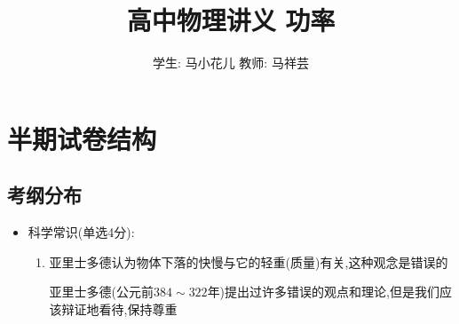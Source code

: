 \documentclass{article}
\title{高中物理讲义 \quad 功率}
\author{学生: 马小花儿 \quad 教师: 马祥芸}
\begin{document}
    \maketitle
    \tableofcontents
    \newpage

    \section{半期试卷结构}  
    \subsection{考纲分布}
    \begin{itemize}
        \item 科学常识(单选4分):
        
        \begin{enumerate}
            \item 亚里士多德认为物体下落的快慢与它的轻重(质量)有关,这种观念是错误的
            
            \vspace{-1em}

            \hspace{-1em}\begin{adjustbox}{minipage=0.91\linewidth, bgcolor=gray!20, padding=1em}
                \small %
                亚里士多德(公元前$384\sim322$年)提出过许多错误的观点和理论,但是我们应该辩证地看待,保持尊重
            \end{adjustbox}

            \vspace{-1em}


\end{enumerate}
\end{itemize}
\end{document}
